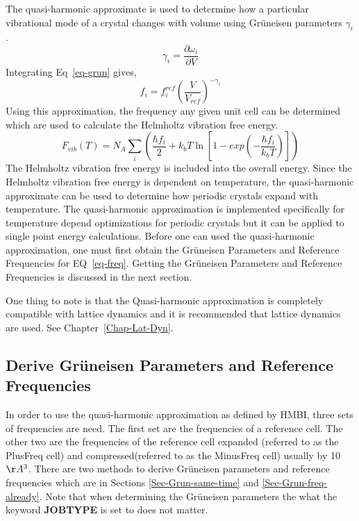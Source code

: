 \documentclass[11pt,letterpaper]{article}
\begin{document}
\begin{spacing}{1.0}
The quasi-harmonic approximate is used to determine how a particular
 vibrational mode of a crystal changes with 
volume using Gr\"{u}neisen parameters $\gamma_{i}$.
\begin{equation}
\label{eq-grun}
\gamma_{i} = \frac{\partial \omega_{i}}{\partial V}
\end{equation} 
Integrating Eq~\ref{eq-grun} gives,
\begin{equation}
\label{eq-freq}
f_{i}  = f_{i}^{ref}\left(\frac{V}{V_{ref}}\right)^{-\gamma_{i}}
\end{equation}
Using this approximation, the frequency any given unit cell can be determined which 
are used to calculate the Helmholtz vibration free energy.
\begin{equation}
 F_{vib}(T) = N_A\sum_i{\left(\frac{\hbar f_{i}}{2} 
+ k_bT \ln{\left[1-exp\left(-\frac{\hbar f_{i}}{k_bT}\right)\right]}\right)}
\end{equation} 
The Helmholtz vibration free energy is included into the overall energy.
Since the Helmholtz vibration free energy is dependent on temperature, the quasi-harmonic approximate 
can be used to determine how periodic crystals expand with temperature. The quasi-harmonic approximation
is implemented specifically for temperature depend optimizations for periodic crystals but it can be applied
to single point energy calculations. Before one can used the quasi-harmonic approximation, one must
first obtain the Gr\"{u}neisen  Parameters and  Reference Frequencies for EQ~\ref{eq-freq}. Getting the
Gr\"{u}neisen  Parameters and  Reference Frequencies is discussed in the next section.

One thing to note is that the Quasi-harmonic approximation is completely compatible with lattice dynamics and it is
recommended that lattice dynamics are used. See Chapter~\ref{Chap-Lat-Dyn}.


\subsection{Derive Gr\"{u}neisen  Parameters and  Reference Frequencies}

In order to use the quasi-harmonic approximation as defined by HMBI, three sets of 
frequencies are need. The first set are the frequencies of a reference cell. The other 
two are the frequencies of the reference 
cell expanded (referred to as the PlusFreq cell) and compressed(referred to as the MinusFreq cell)
usually by 10 $\AA^3$. There are two methods to derive Gr\"{u}neisen  parameters and reference frequencies which are 
in Sections \ref{Sec-Grun-same-time} and \ref{Sec-Grun-freq-already}. Note that when determining the Gr\"{u}neisen parameters
the what the keyword {\bf JOBTYPE} is set to does not matter.\\



\end{spacing}
\end{document}
